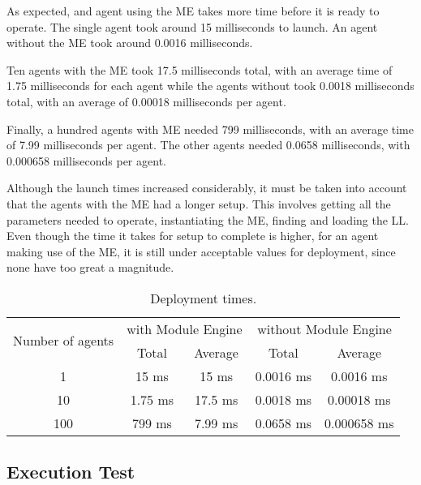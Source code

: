 As expected, and agent using the \acrshort{ME} takes more time before it is ready to operate. The single agent took around 15 milliseconds to launch. An agent without the \acrshort{ME} took around 0.0016 milliseconds.

Ten agents with the \acrshort{ME} took 17.5 milliseconds total, with an average time of 1.75 milliseconds for each agent while the agents without took 0.0018 milliseconds total, with an average of 0.00018 milliseconds per agent. 

Finally, a hundred agents with \acrshort{ME} needed 799 milliseconds, with an average time of 7.99 milliseconds per agent. The other agents needed 0.0658 milliseconds, with 0.000658 milliseconds per agent.

Although the launch times increased considerably, it must be taken into account that the agents with the \acrlong{ME} had a longer setup. This involves getting all the parameters needed to operate, instantiating the \acrshort{ME}, finding and loading the \acrshort{LL}. Even though the time it takes for setup to complete is higher, for an agent making use of the \acrshort{ME}, it is still under acceptable values for deployment, since none have too great a magnitude.

\begin{table}[h!]
	\caption{Deployment times.}
	\centering
	\begin{tabular}{|c|cc|cc|}
		\hline
		\multirow{2}{*}{Number of agents} & \multicolumn{2}{c|}{with Module Engine} 				& \multicolumn{2}{c|}{without Module Engine} \\ \cline{2-5} 
										  & \multicolumn{1}{c|}{Total}   	  & Average  			& \multicolumn{1}{c|}{Total}      			& Average  	  \\ \hline
		1                                 & \multicolumn{1}{c|}{15 ms}        & 15 ms               & \multicolumn{1}{c|}{0.0016 ms}    		& 0.0016 ms   \\ \hline
		10                                & \multicolumn{1}{c|}{1.75 ms}      & 17.5 ms             & \multicolumn{1}{c|}{0.0018 ms}    		& 0.00018 ms  \\ \hline
		100                               & \multicolumn{1}{c|}{799 ms}       & 7.99 ms             & \multicolumn{1}{c|}{0.0658 ms}  			& 0.000658 ms \\ \hline
	\end{tabular}
	\label{tab:deployment_times}
\end{table}

\subsection{Execution Test}

